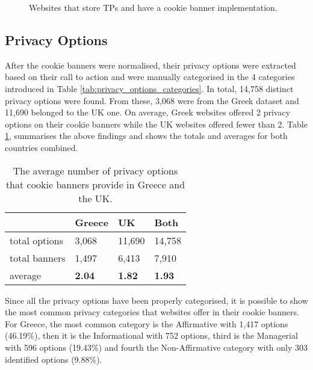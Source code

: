 \documentclass[../main.tex]{subfiles}
\begin{document}
\begin{figure}[ht]
    \centering
    \renewcommand{\bcfontstyle}{}
    \begin{bchart}[step=10,max=80, unit=\%]
        \bigskip
    \end{bchart}
    \caption{Websites that store TPs and have a cookie banner implementation.}
    \label{fig:prevalence_cookie_banners_tps}
\end{figure}


\subsection{Privacy Options}
After the cookie banners were normalised, their privacy options were extracted based on their call to action and were manually categorised in the 4 categories introduced in Table \ref{tab:privacy_options_categories}. In total, 14,758 distinct privacy options were found. From these, 3,068 were from the Greek dataset and 11,690 belonged to the UK one. On average, Greek websites offered 2 privacy options on their cookie banners while the UK websites offered fewer than 2. Table \ref{tab:avg_options}, summarises the above findings and shows the totals and averages for both countries combined.

\begin{table}[ht]
    \centering
    \begin{tabular}{@{}llll@{}}
        \toprule
                      & Greece         & UK             & Both          \\ \midrule
        total options & 3,068          & 11,690         & 14,758         \\
        total banners & 1,497          & 6,413          & 7,910          \\
        average       & \textbf{2.04}  & \textbf{1.82}  & \textbf{1.93} \\ \bottomrule
    \end{tabular}
    \caption{The average number of privacy options that cookie banners provide in Greece and the UK.}
    \label{tab:avg_options}
\end{table}

Since all the privacy options have been properly categorised, it is possible to show the most common privacy categories that websites offer in their cookie banners. For Greece, the most common category is the Affirmative with 1,417 options (46.19\%), then it is the Informational with 752 options, third is the Managerial with 596 options (19.43\%) and fourth the Non-Affirmative category with only 303 identified options (9.88\%).
\end{document}
